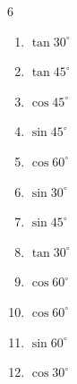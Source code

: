 \begin{multicols}{6}
\begin{enumerate}

  \item $\displaystyle \tan{30^\circ}$


  \item $\displaystyle \tan{45^\circ}$

        \phantom{$\displaystyle =1$}

  \item $\displaystyle \cos{45^\circ}$


  \item $\displaystyle \sin{45^\circ}$


  \item $\displaystyle \cos{60^\circ}$


  \item $\displaystyle \sin{30^\circ}$


  \item $\displaystyle \sin{45^\circ}$


\columnbreak %

  \item $\displaystyle \tan{30^\circ}$


  \item $\displaystyle \cos{60^\circ}$


  \item $\displaystyle \cos{60^\circ}$


  \item $\displaystyle \sin{60^\circ}$


  \item $\displaystyle \cos{30^\circ}$



\end{enumerate}
\end{multicols}

